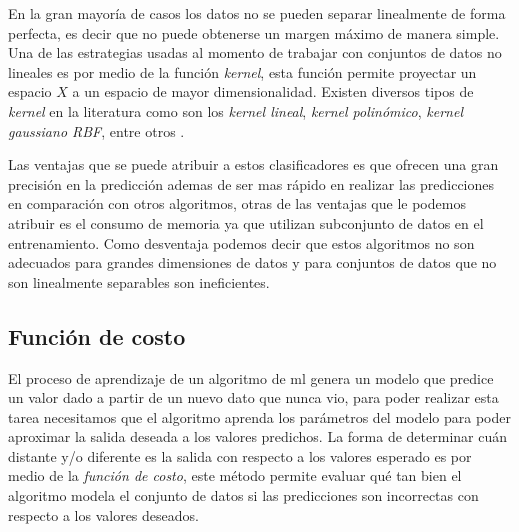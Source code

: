 En la gran mayoría de casos los datos no se pueden separar linealmente de forma perfecta, es decir que no puede obtenerse un margen máximo de manera simple. Una de las estrategias usadas al momento de trabajar con conjuntos de datos no lineales es por medio de la función  \textit{kernel}, esta función permite proyectar un espacio $ X$ a un espacio de mayor dimensionalidad. Existen diversos tipos de \textit{kernel} en la literatura como son los \textit{kernel lineal}, \textit{kernel polinómico}, \textit{kernel gaussiano RBF}, entre otros \citep{SVM}. 

Las ventajas que se puede atribuir a estos clasificadores es que ofrecen una gran precisión en la predicción ademas de ser mas rápido en realizar las predicciones en comparación con otros algoritmos, otras de las ventajas que le podemos atribuir es el consumo de memoria ya que utilizan subconjunto de datos en el entrenamiento. Como desventaja podemos decir que estos algoritmos no son adecuados para grandes dimensiones de datos y para conjuntos de datos que no son linealmente separables son ineficientes.


\subsection{Función de costo}\label{sub:funcion_costo}


El proceso de aprendizaje de un algoritmo de \ac{ml} genera un  modelo que predice un valor dado a partir de un nuevo dato que nunca vio, para poder realizar esta tarea necesitamos que el algoritmo aprenda los parámetros del modelo para poder aproximar la salida deseada a los valores predichos. La forma de determinar cuán distante y/o diferente es la salida con respecto a los valores esperado es por medio de la \textit{función de costo}, este método permite evaluar qué tan bien el algoritmo modela el conjunto de datos si las predicciones son incorrectas con respecto a los valores deseados. 

